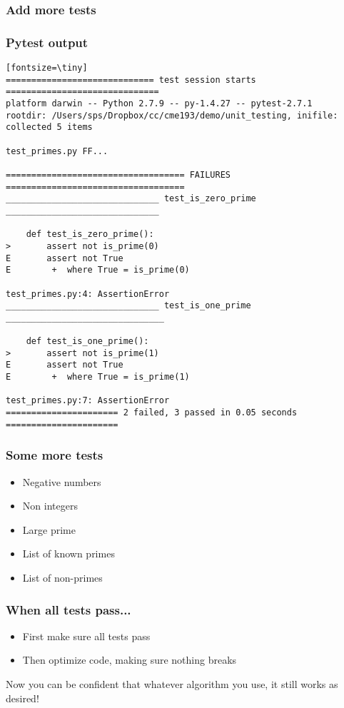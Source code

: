 \begin{frame}\frametitle{Add more tests}



\end{frame}

\begin{frame}[fragile]\frametitle{Pytest output}

\begin{verbatim}[fontsize=\tiny]
============================= test session starts ==============================
platform darwin -- Python 2.7.9 -- py-1.4.27 -- pytest-2.7.1
rootdir: /Users/sps/Dropbox/cc/cme193/demo/unit_testing, inifile:
collected 5 items

test_primes.py FF...

=================================== FAILURES ===================================
______________________________ test_is_zero_prime ______________________________

    def test_is_zero_prime():
>       assert not is_prime(0)
E       assert not True
E        +  where True = is_prime(0)

test_primes.py:4: AssertionError
______________________________ test_is_one_prime _______________________________

    def test_is_one_prime():
>       assert not is_prime(1)
E       assert not True
E        +  where True = is_prime(1)

test_primes.py:7: AssertionError
====================== 2 failed, 3 passed in 0.05 seconds ======================
\end{verbatim}

\end{frame}

\begin{frame}[t]\frametitle{Some more tests}

\begin{itemize}
    \item Negative numbers
    \item Non integers
    \item Large prime
    \item List of known primes
    \item List of non-primes
\end{itemize}

\end{frame}

\begin{frame}\frametitle{When all tests pass...}

\begin{itemize}
    \item First make sure all tests pass
    \item Then optimize code, making sure nothing breaks
\end{itemize}

Now you can be confident that whatever algorithm you use, it still works as desired!

\end{frame}

